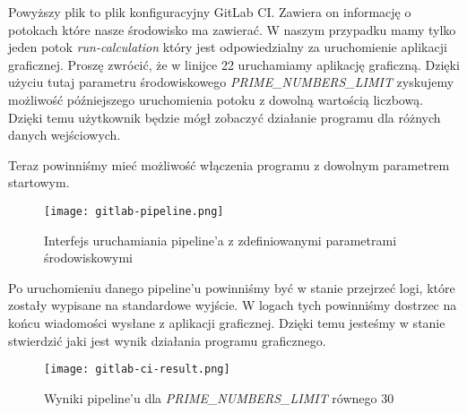 Powyższy plik to plik konfiguracyjny GitLab CI. Zawiera on informację o potokach które nasze środowisko ma zawierać. W naszym przypadku mamy tylko jeden potok \textit{run-calculation} który jest odpowiedzialny za uruchomienie aplikacji graficznej. Proszę zwrócić, że w linijce 22 uruchamiamy aplikację graficzną. Dzięki użyciu tutaj parametru środowiskowego \textit{PRIME\_NUMBERS\_LIMIT} zyskujemy możliwość późniejszego uruchomienia potoku z dowolną wartością liczbową. Dzięki temu użytkownik będzie mógł zobaczyć działanie programu dla różnych danych wejściowych.
\par
Teraz powinniśmy mieć możliwość włączenia programu z dowolnym parametrem startowym.
\begin{figure}[htbp]
  \centering
  \texttt{[image: gitlab-pipeline.png]}
  \caption{Interfejs uruchamiania pipeline'a z zdefiniowanymi parametrami środowiskowymi}
  \label{fig:gitlab_pipeline}
\end{figure}
Po uruchomieniu danego pipeline'u powinniśmy być w stanie przejrzeć logi, które zostały wypisane na standardowe wyjście. W logach tych powinniśmy dostrzec na końcu wiadomości wysłane z aplikacji graficznej. Dzięki temu jesteśmy w stanie stwierdzić jaki jest wynik działania programu graficznego.
\begin{figure}[htbp]
  \centering
  \texttt{[image: gitlab-ci-result.png]}
  \caption{Wyniki pipeline'u dla \textit{PRIME\_NUMBERS\_LIMIT} równego 30}
  \label{fig:gitlab_pipeline_result}
\end{figure}